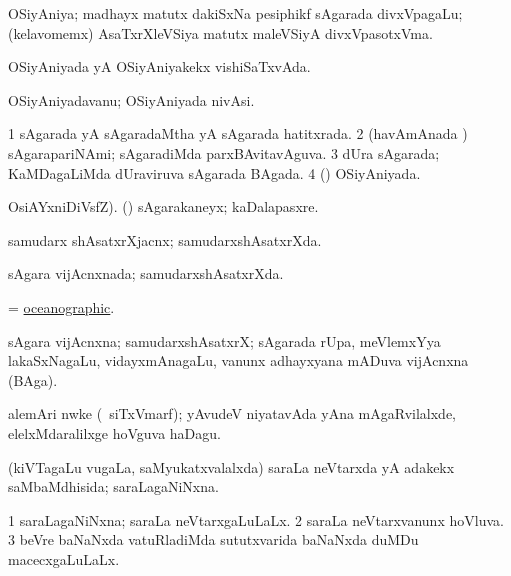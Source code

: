 \bentry
{}
\gl{\nA}
\bmng
OSiyAniya; madhayx matutx dakiSxNa pesiphikf sAgarada divxVpagaLu; (kelavomemx) AsaTxrXleVSiya matutx maleVSiyA divxVpasotxVma. 
\emng
\eentry

\bentry
{}
\gl{\gu}
\bmng
OSiyAniyada yA OSiyAniyakekx vishiSaTxvAda. 
\emng
\eentry

\bentry
{}
\gl{\nA}
\bmng
OSiyAniyadavanu; OSiyAniyada nivAsi. 
\emng
\eentry

\bentry
{}
\gl{\gu}
\bmng
\bnum
\num{1} sAgarada yA sAgaradaMtha yA sAgarada hatitxrada. 
\num{2} (havAmAnada \vi) sAgarapariNAmi; sAgaradiMda parxBAvitavAguva. 
\num{3} dUra sAgarada; KaMDagaLiMda dUraviruva sAgarada BAgada. 
\num{4} () OSiyAniyada. 
\enum
\emng
\eentry

\bentry
{}
\gl{\nA}
OsiAYxniDiVsfZ).\bmng
(\girxVpu) sAgarakaneyx; kaDalapasxre. 
\emng
\eentry

\bentry
{}
\gl{\nA}
\bmng
samudarx shAsatxrXjacnx; samudarxshAsatxrXda. 
\emng
\eentry

\bentry
{}
\gl{\gu}
\bmng
sAgara vijAcnxnada; samudarxshAsatxrXda. 
\emng
\eentry

\bentry
{}
\gl{\gu}
\bmng
= \hyperlink{oceanographic}{oceanographic}. 
\emng
\eentry

\bentry
{}
\gl{\nA}
\bmng
sAgara vijAcnxna; samudarxshAsatxrX; sAgarada rUpa, meVlemxYya lakaSxNagaLu, vidayxmAnagaLu, \mo vanunx adhayxyana mADuva vijAcnxna (BAga). 
\emng
\eentry

\bentry
{}
\gl{\nA}
\bmng
alemAri nwke (\kanmu\ siTxVmarf); yAvudeV niyatavAda yAna mAgaRvilalxde, elelxMdaralilxge hoVguva haDagu. 
\emng
\eentry

\bentry
{}
\gl{\gu}
\bmng
(kiVTagaLu \mo vugaLa, saMyukatxvalalxda) saraLa neVtarxda yA adakekx saMbaMdhisida; saraLagaNiNxna. 
\emng
\eentry

\bentry
{}
\gl{\gu}
\bmng
\bnum
\num{1} saraLagaNiNxna; saraLa neVtarxgaLuLaLx. 
\num{2} saraLa neVtarxvanunx hoVluva. 
\num{3} beVre baNaNxda vatuRladiMda sututxvarida baNaNxda duMDu macecxgaLuLaLx. 
\enum
\emng
\eentry

